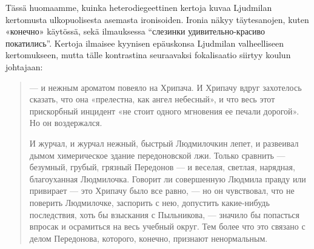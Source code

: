 \documentclass[12pt,a4paper]{article}
\begin{document}
Tässä huomaamme, kuinka heterodiegeettinen kertoja kuvaa Ljudmilan kertomusta ulkopuolisesta asemasta ironisoiden. Ironia näkyy täytesanojen,  kuten «конечно» käytössä, sekä ilmauksessa \enquote{слезинки 
удивительно-красиво покатились}. Kertoja ilmaisee kyynisen epäuskonsa Ljudmilan valheelliseen kertomukseen, mutta tälle kontrastina seuraavaksi fokalisaatio siirtyy koulun johtajaan:
\begin{quote}

— и нежным ароматом повеяло на Хрипача. И Хрипачу
вдруг захотелось сказать, что она «прелестна, как ангел небесный», и
что весь этот прискорбный инцидент «не стоит одного мгновения ее 
печали дорогой». Но он воздержался.

И журчал, и журчал нежный, быстрый Людмилочкин лепет, и 
развеивал дымом химерическое здание передоновской лжи. Только 
сравнить — безумный, грубый, грязный Передонов — и веселая, светлая,
нарядная, благоуханная Людмилочка. Говорит ли совершенную 
Людмила правду или привирает — это Хрипачу было все равно, — но он 
чувствовал, что не поверить Людмилочке, заспорить с нею, допустить 
какие-нибудь последствия, хоть бы взыскания с Пыльникова, — значило
бы попасться впросак и осрамиться на весь учебный округ. Тем более
что это связано с делом Передонова, которого, конечно, признают 
ненормальным. \parencite[240]{sologub2004}
\end{quote}
\end{document}
